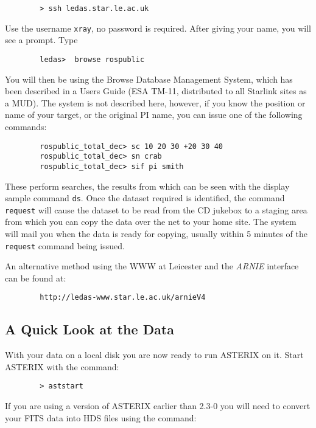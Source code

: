\documentclass[11pt,fleqn]{article}    %
\begin{document}
\begin{verbatim}
        > ssh ledas.star.le.ac.uk
\end{verbatim}

Use the username {\tt xray}, no password is required. After giving your
name, you will see a prompt. Type

\begin{verbatim}
        ledas>  browse rospublic
\end{verbatim}

You will then be using the Browse Database Management System, which has
been described in a Users Guide (ESA TM-11, distributed to all Starlink
sites as a MUD). The system is not described here, however, if you know
the position or name of your target, or the original PI name, you can
issue one of the following commands: 

\begin{verbatim}
        rospublic_total_dec> sc 10 20 30 +20 30 40
        rospublic_total_dec> sn crab
        rospublic_total_dec> sif pi smith
\end{verbatim}

These perform searches, the results from which can be seen with the
display sample command {\tt ds}. Once the dataset required is identified,
the command {\tt request} will cause the dataset to be read from the CD
jukebox to a staging area from which you can copy the data over the net
to your home site. The system will mail you when the data is ready for
copying, usually within 5 minutes of the {\tt request} command being
issued.

An alternative method using the WWW at Leicester and the {\it ARNIE}
interface can be found at:

\begin{verbatim}
        http://ledas-www.star.le.ac.uk/arnieV4
\end{verbatim}

\subsection{A Quick Look at the Data}
With your data on a local disk  you are now ready to run ASTERIX on it.
Start ASTERIX with the command:

\begin{verbatim}
        > aststart
\end{verbatim}

If you are using a version of ASTERIX earlier than 2.3-0 you will need to 
convert your FITS data into HDS files using the command:
\end{document}
